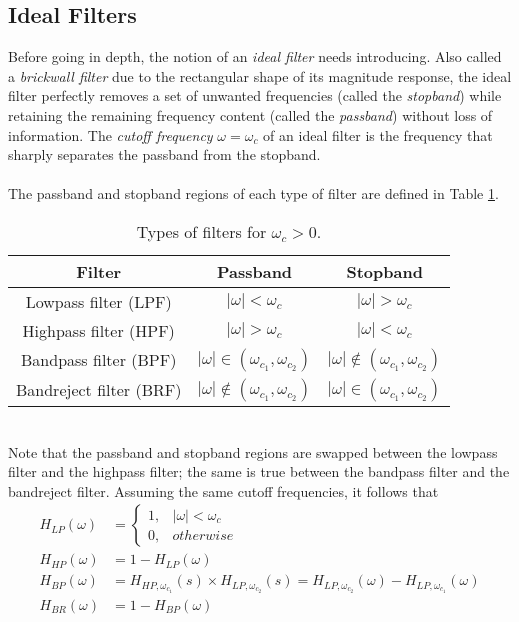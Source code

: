 \documentclass{report}
\begin{document}
\subsection{Ideal Filters}
Before going in depth, the notion of an \emph{ideal filter} needs introducing. Also called a \emph{brickwall filter} due to the rectangular shape of its magnitude response, the ideal filter perfectly removes a set of unwanted frequencies (called the \emph{stopband}) 
while retaining the remaining frequency content (called the \emph{passband}) without loss of information. The \emph{cutoff frequency} $\omega=\omega_c$ of an ideal filter is the frequency that sharply separates the passband from the stopband.
\\ \\
The passband and stopband regions of each type of filter are defined in Table \ref{filter_type}.
\begin{table}[!hbt]
    \centering
    \caption{Types of filters for $\omega_c>0$.}
    \label{filter_type}
    \begin{tabular}{|c|c|c|}
        \hline
        Filter & Passband & Stopband \\
        \hline
        Lowpass filter (LPF) & $|\omega|<\omega_c$ & $|\omega|>\omega_c$ \\
        Highpass filter (HPF) & $|\omega|>\omega_c$ & $|\omega|<\omega_c$ \\
        Bandpass filter (BPF) & $|\omega|\in(\omega_{c_1},\omega_{c_2})$ & $|\omega|\notin(\omega_{c_1},\omega_{c_2})$ \\
        Bandreject filter (BRF) & $|\omega|\notin(\omega_{c_1},\omega_{c_2})$ & $|\omega|\in(\omega_{c_1},\omega_{c_2})$ \\
        \hline
    \end{tabular}
\end{table}
\\
Note that the passband and stopband regions are swapped between the lowpass filter and the highpass filter; the same is true between the bandpass filter and the bandreject filter. 
Assuming the same cutoff frequencies, it follows that 
\begin{align}
    H_{LP}(\omega) &= 
    \begin{cases}
        1, & |\omega| < \omega_c \\
        0, & otherwise
    \end{cases} \\
    H_{HP}(\omega) &= 1 - H_{LP}(\omega) \\ 
    H_{BP}(\omega) &= H_{HP,\omega_{c_1}}(s)\times H_{LP,\omega_{c_2}}(s) = H_{LP,\omega_{c_2}}(\omega) - H_{LP,\omega_{c_1}}(\omega) \\
    H_{BR}(\omega) &= 1 - H_{BP}(\omega)
\end{align}
\end{document}
